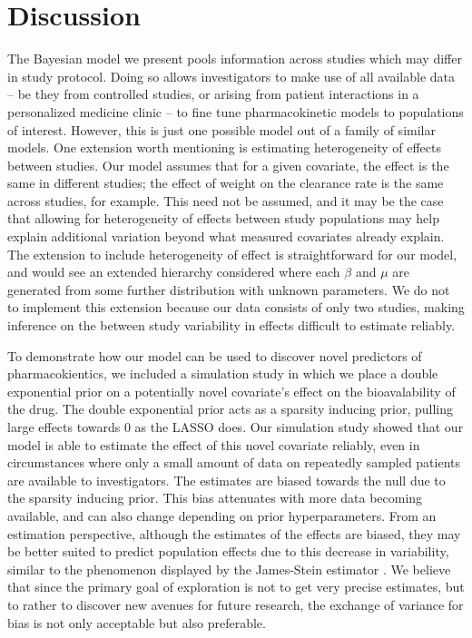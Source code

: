\section{Discussion}


The Bayesian model we present pools information across studies which may differ in study protocol.  Doing so allows investigators to make use of all available data -- be they from controlled studies, or arising from patient interactions in a personalized medicine clinic -- to fine tune pharmacokinetic models to populations of interest. However, this is just one possible model out of a family of similar models. One extension worth mentioning is estimating heterogeneity of effects between studies.  Our model assumes that for a given covariate, the effect is the same in different studies; the effect of weight on the clearance rate is the same across studies, for example.  This need not be assumed, and it may be the case that allowing for heterogeneity of effects between study populations may help explain additional variation beyond what measured covariates already explain.  The extension to include heterogeneity of effect is straightforward for our model, and would see an extended hierarchy considered where each $\beta$ and $\mu$ are generated from some further distribution with unknown parameters. We do not to implement this extension because our data consists of only two studies, making inference on the between study variability in effects difficult to estimate reliably.

To demonstrate how our model can be used to discover novel predictors of pharmacokientics, we included a simulation study in which we place a double exponential prior on a potentially novel covariate's effect on the bioavalability of the drug.  The double exponential prior acts as a sparsity inducing prior, pulling large effects towards 0 as the LASSO does. Our simulation study showed that our model is able to estimate the effect of this novel covariate reliably, even in circumstances where only a small amount of data on repeatedly sampled patients are available to investigators.  The estimates are biased towards the null due to the sparsity inducing prior. This bias attenuates with more data becoming available, and can also change depending on prior hyperparameters. From an estimation perspective, although the estimates of the effects are biased, they may be better suited to predict population effects due to this decrease in variability, similar to the phenomenon displayed by the James-Stein estimator \cite{stein1956inadmissibility,james1992estimation}.  We believe that since the primary goal of exploration is not to get very precise estimates, but to rather to discover new avenues for future research, the exchange of variance for bias is not only acceptable but also preferable.

